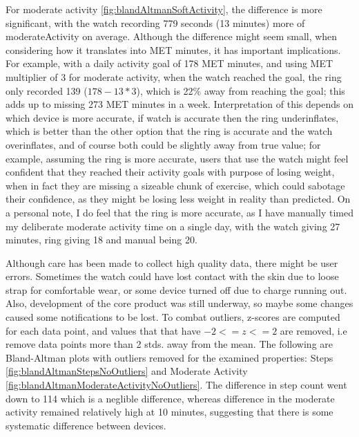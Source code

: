For moderate activity \ref{fig:blandAltmanSoftActivity}, the difference is more significant, with the watch recording 779 seconds (13 minutes) more of moderateActivity on average. Although the difference might seem small, when considering how it translates into MET minutes, it has important implications. For example, with a daily activity goal of 178 MET minutes, and using MET multiplier of 3 for moderate activity, when the watch reached the goal, the ring only recorded 139 ($178 - 13 * 3$), which is 22\% away from reaching the goal; this adds up to missing 273 MET minutes in a week. Interpretation of this depends on which device is more accurate, if watch is accurate then the ring underinflates, which is better than the other option that the ring is accurate and the watch overinflates, and of course both could be slightly away from true value; for example, assuming the ring is more accurate, users that use the watch might feel confident that they reached their activity goals with purpose of losing weight, when in fact they are missing a sizeable chunk of exercise, which could sabotage their confidence, as they might be losing less weight in reality than predicted. On a personal note, I do feel that the ring is more accurate, as I have manually timed my deliberate moderate activity time on a single day, with the watch giving 27 minutes, ring giving 18 and manual being 20.

Although care has been made to collect high quality data, there might be user errors. Sometimes the watch could have lost contact with the skin due to loose strap for comfortable wear, or some device turned off due to charge running out. Also, development of the core product was still underway, so maybe some changes caused some notifications to be lost. To combat outliers, z-scores are computed for each data point, and values that that have $-2 <= z <= 2$ are removed, i.e remove data points more than 2 stds. away from the mean. The following are Bland-Altman plots with outliers removed for the examined properties: Steps \ref{fig:blandAltmanStepsNoOutliers} and Moderate Activity \ref{fig:blandAltmanModerateActivityNoOutliers}. The difference in step count went down to 114 which is a neglible difference, whereas difference in the moderate activity remained relatively high at 10 minutes, suggesting that there is some systematic difference between devices.

